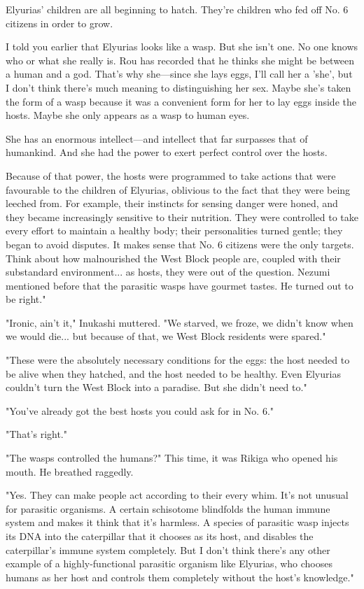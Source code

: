 Elyurias' children are all beginning to hatch. They're children who fed
off No. 6 citizens in order to grow.

I told you earlier that Elyurias looks like a wasp. But she isn't one.
No one knows who or what she really is. Rou has recorded that he thinks
she might be between a human and a god. That's why she---since she lays
eggs, I'll call her a 'she', but I don't think there's much meaning to
distinguishing her sex. Maybe she's taken the form of a wasp because it
was a convenient form for her to lay eggs inside the hosts. Maybe she
only appears as a wasp to human eyes.

She has an enormous intellect---and intellect that far surpasses that of
humankind. And she had the power to exert perfect control over the
hosts.

Because of that power, the hosts were programmed to take actions that
were favourable to the children of Elyurias, oblivious to the fact that
they were being leeched from. For example, their instincts for sensing
danger were honed, and they became increasingly sensitive to their
nutrition. They were controlled to take every effort to maintain a
healthy body; their personalities turned gentle; they began to avoid
disputes. It makes sense that No. 6 citizens were the only targets.
Think about how malnourished the West Block people are, coupled with
their substandard environment... as hosts, they were out of the
question. Nezumi mentioned before that the parasitic wasps have gourmet
tastes. He turned out to be right."

"Ironic, ain't it," Inukashi muttered. "We starved, we froze, we didn't
know when we would die... but because of that, we West Block residents
were spared."

"These were the absolutely necessary conditions for the eggs: the host
needed to be alive when they hatched, and the host needed to be healthy.
Even Elyurias couldn't turn the West Block into a paradise. But she
didn't need to."

"You've already got the best hosts you could ask for in No. 6."

"That's right."

"The wasps controlled the humans?" This time, it was Rikiga who opened
his mouth. He breathed raggedly.

"Yes. They can make people act according to their every whim. It's not
unusual for parasitic organisms. A certain schisotome blindfolds the
human immune system and makes it think that it's harmless. A species of
parasitic wasp injects its DNA into the caterpillar that it chooses as
its host, and disables the caterpillar's immune system completely. But I
don't think there's any other example of a highly-functional parasitic
organism like Elyurias, who chooses humans as her host and controls them
completely without the host's knowledge."

